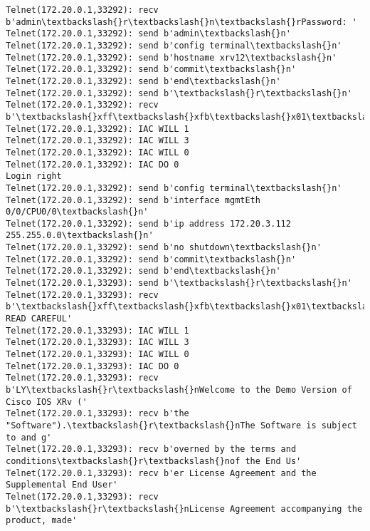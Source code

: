 \documentclass[11pt]{article}
\begin{document}
\begin{Verbatim}[commandchars=\\\{\}]
Telnet(172.20.0.1,33292): recv b'admin\textbackslash{}r\textbackslash{}n\textbackslash{}rPassword: '
Telnet(172.20.0.1,33292): send b'admin\textbackslash{}n'
Telnet(172.20.0.1,33292): send b'config terminal\textbackslash{}n'
Telnet(172.20.0.1,33292): send b'hostname xrv12\textbackslash{}n'
Telnet(172.20.0.1,33292): send b'commit\textbackslash{}n'
Telnet(172.20.0.1,33292): send b'end\textbackslash{}n'
Telnet(172.20.0.1,33292): send b'\textbackslash{}r\textbackslash{}n'
Telnet(172.20.0.1,33292): recv b'\textbackslash{}xff\textbackslash{}xfb\textbackslash{}x01\textbackslash{}xff\textbackslash{}xfb\textbackslash{}x03\textbackslash{}xff\textbackslash{}xfb\textbackslash{}x00\textbackslash{}xff\textbackslash{}xfd\textbackslash{}x00\textbackslash{}x1b]0;xrv12\textbackslash{}x07\textbackslash{}r\textbackslash{}n\textbackslash{}rRP/0/0/CPU0:xrv12\#\textbackslash{}r\textbackslash{}n\textbackslash{}rRP/0'
Telnet(172.20.0.1,33292): IAC WILL 1
Telnet(172.20.0.1,33292): IAC WILL 3
Telnet(172.20.0.1,33292): IAC WILL 0
Telnet(172.20.0.1,33292): IAC DO 0
Login right
Telnet(172.20.0.1,33292): send b'config terminal\textbackslash{}n'
Telnet(172.20.0.1,33292): send b'interface mgmtEth 0/0/CPU0/0\textbackslash{}n'
Telnet(172.20.0.1,33292): send b'ip address 172.20.3.112 255.255.0.0\textbackslash{}n'
Telnet(172.20.0.1,33292): send b'no shutdown\textbackslash{}n'
Telnet(172.20.0.1,33292): send b'commit\textbackslash{}n'
Telnet(172.20.0.1,33292): send b'end\textbackslash{}n'
Telnet(172.20.0.1,33293): send b'\textbackslash{}r\textbackslash{}n'
Telnet(172.20.0.1,33293): recv b'\textbackslash{}xff\textbackslash{}xfb\textbackslash{}x01\textbackslash{}xff\textbackslash{}xfb\textbackslash{}x03\textbackslash{}xff\textbackslash{}xfb\textbackslash{}x00\textbackslash{}xff\textbackslash{}xfd\textbackslash{}x00\textbackslash{}x1b]0;xrv13\textbackslash{}x07\textbackslash{}r\textbackslash{}n\textbackslash{}r\textbackslash{}nIMPORTANT:  READ CAREFUL'
Telnet(172.20.0.1,33293): IAC WILL 1
Telnet(172.20.0.1,33293): IAC WILL 3
Telnet(172.20.0.1,33293): IAC WILL 0
Telnet(172.20.0.1,33293): IAC DO 0
Telnet(172.20.0.1,33293): recv b'LY\textbackslash{}r\textbackslash{}nWelcome to the Demo Version of Cisco IOS XRv ('
Telnet(172.20.0.1,33293): recv b'the "Software").\textbackslash{}r\textbackslash{}nThe Software is subject to and g'
Telnet(172.20.0.1,33293): recv b'overned by the terms and conditions\textbackslash{}r\textbackslash{}nof the End Us'
Telnet(172.20.0.1,33293): recv b'er License Agreement and the Supplemental End User'
Telnet(172.20.0.1,33293): recv b'\textbackslash{}r\textbackslash{}nLicense Agreement accompanying the product, made'

\end{Verbatim}
\end{document}
